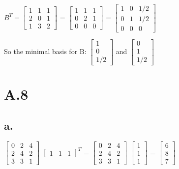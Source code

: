 \documentclass{article}
\begin{document}
$B^T=\begin{bmatrix}
1 & 1 & 1\\
2 & 0 & 1\\
1 & 3 & 2
\end{bmatrix}$
=
$\begin{bmatrix}
1 & 1 & 1\\
0 & 2 & 1\\
0 & 0 & 0
\end{bmatrix}$
=
$\begin{bmatrix}
1 & 0 & 1/2\\
0 & 1 & 1/2\\
0 & 0 & 0
\end{bmatrix}$\newline


So the minimal basis for B: 
$\begin{bmatrix}
1\\ 
0\\
1/2
\end{bmatrix}$
and
$\begin{bmatrix}
0\\ 
1\\
1/2
\end{bmatrix}$


\section{A.8}
\subsection{a.}

$\begin{bmatrix}
0 & 2 & 4\\
2 & 4 & 2\\
3 & 3 & 1
\end{bmatrix}$
$\begin{bmatrix}
1 & 1 & 1
\end{bmatrix}^T$
=
$\begin{bmatrix}
0 & 2 & 4\\
2 & 4 & 2\\
3 & 3 & 1
\end{bmatrix}$
$\begin{bmatrix}
1\\
1\\
1
\end{bmatrix}$
=
$\begin{bmatrix}
6\\
8\\
7
\end{bmatrix}$
\end{document}
